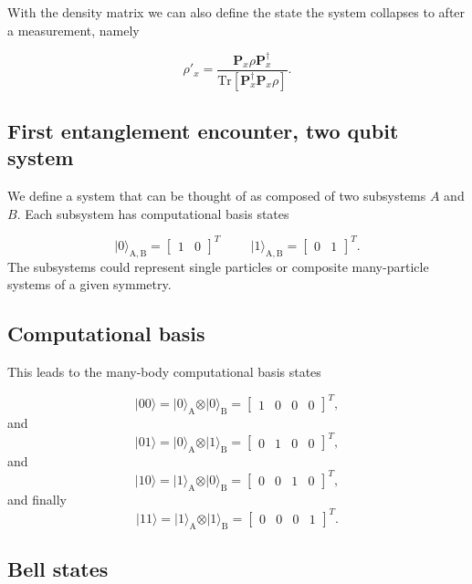 \noindent
With the density matrix we can also define the state the system collapses to after a measurement, namely

\[
\rho'_x=\frac{\bm{P}_x\rho\bm{P}_x^{\dagger}}{\mathrm{Tr}[\bm{P}_x^{\dagger}\bm{P}_x\rho]}.
\]

\subsection{First entanglement encounter, two qubit system}

We define a system that can be thought of as composed of two subsystems
$A$ and $B$. Each subsystem has computational basis states

\[
\vert 0\rangle_{\mathrm{A,B}}=\begin{bmatrix} 1 & 0\end{bmatrix}^T \hspace{1cm} \vert 1\rangle_{\mathrm{A,B}}=\begin{bmatrix} 0 & 1\end{bmatrix}^T.
\]
The subsystems could represent single particles or composite many-particle systems of a given symmetry.

\subsection{Computational basis}

This leads to the many-body computational basis states

\[
\vert 00\rangle = \vert 0\rangle_{\mathrm{A}}\otimes \vert 0\rangle_{\mathrm{B}}=\begin{bmatrix} 1 & 0 & 0 &0\end{bmatrix}^T,
\]
and
\[
\vert 01\rangle = \vert 0\rangle_{\mathrm{A}}\otimes \vert 1\rangle_{\mathrm{B}}=\begin{bmatrix} 0 & 1 & 0 &0\end{bmatrix}^T,
\]
and
\[
\vert 10\rangle = \vert 1\rangle_{\mathrm{A}}\otimes \vert 0\rangle_{\mathrm{B}}=\begin{bmatrix} 0 & 0 & 1 &0\end{bmatrix}^T,
\]
and finally
\[
\vert 11\rangle = \vert 1\rangle_{\mathrm{A}}\otimes \vert 1\rangle_{\mathrm{B}}=\begin{bmatrix} 0 & 0 & 0 &1\end{bmatrix}^T.
\]

\subsection{Bell states}

